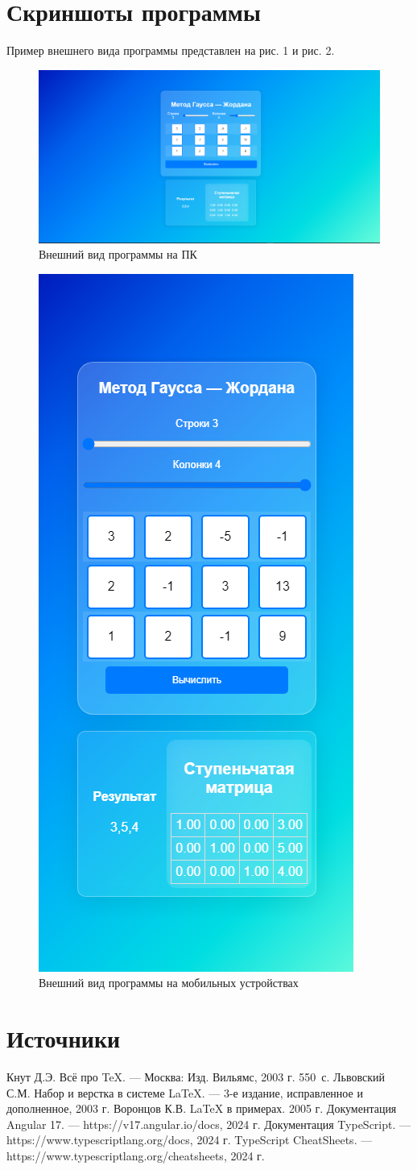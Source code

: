 \documentclass[12pt,a4paper]{scrartcl}
\begin{document}
\section{Скриншоты программы}
\label{sec:program-shots}
Пример внешнего вида программы представлен на рис. 1 и рис. 2.
\begin{figure}[H]
    \centering
    \includegraphics[width=1\linewidth]{PCVersion.png}
    \caption{Внешний вид программы на ПК}
    \label{fig:enter-label}
\end{figure}
\begin{figure}[H]
    \centering
    \includegraphics[width=0.25\linewidth]{PhoneVersion.png}
    \caption{Внешний вид программы на мобильных устройствах}
    \label{fig:enter-label}
\end{figure}

    \section{Источники}
    
\begin{thebibliography}{9}
Кнут Д.Э. Всё про \TeX. \newblock --- Москва: Изд. Вильямс, 2003 г. 550~с.
Львовский С.М. Набор и верстка в системе \LaTeX{}. \newblock --- 3-е издание, исправленное и дополненное, 2003 г.
Воронцов К.В. \LaTeX{} в примерах. 2005 г.
Документация Angular 17. \newblock --- https://v17.angular.io/docs, 2024 г.
Документация TypeScript. \newblock --- https://www.typescriptlang.org/docs, 2024 г.
TypeScript CheatSheets. \newblock --- https://www.typescriptlang.org/cheatsheets, 2024 г.
    \end{thebibliography}
\end{document}

